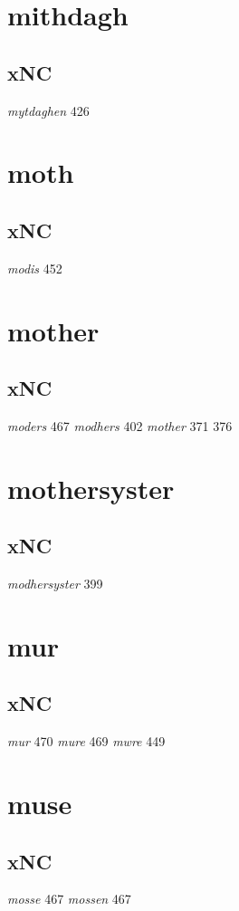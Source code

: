 \documentclass[a4paper,twocolumn]{article}
\begin{document}
\section{mithdagh}
\label{sec:orgdb8cf41}
\subsection{xNC}
\label{sec:org1eacaf4}
\emph{mytdaghen} 426 
\section{moth}
\label{sec:orge298368}
\subsection{xNC}
\label{sec:orgec134b5}
\emph{modis} 452 
\section{mother}
\label{sec:org5674a5c}
\subsection{xNC}
\label{sec:org8c9cd34}
\emph{moders} 467 \emph{modhers} 402 \emph{mother} 371 376 
\section{mothersyster}
\label{sec:org843058d}
\subsection{xNC}
\label{sec:orgc7d24ef}
\emph{modhersyster} 399 
\section{mur}
\label{sec:org1e3c5fb}
\subsection{xNC}
\label{sec:org820a67e}
\emph{mur} 470 \emph{mure} 469 \emph{mwre} 449 
\section{muse}
\label{sec:org3991fe9}
\subsection{xNC}
\label{sec:org2d33f4c}
\emph{mosse} 467 \emph{mossen} 467 
\end{document}
